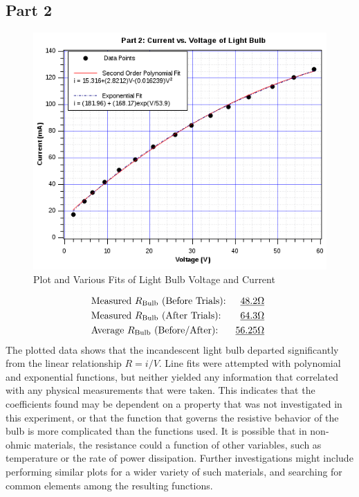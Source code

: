 \documentclass[twocolumn,english]{IEEEtran}
\theoremstyle{plain}
\theoremstyle{plain}
\begin{document}
\subsection*{Part 2}
  \begin{figure}[H]
  \begin{centering}
  \begin{center}
  \includegraphics[width=\linewidth]{./part2graph.png}
  \caption{Plot and Various Fits of Light Bulb Voltage and Current}
  \label{fig:graph_part2}
  \end{center}
  \par\end{centering}
  \end{figure}
  \begin{align*}
  &\text{Measured $R_{\text{Bulb}}$ (Before Trials):} 		&\text{\underline{48.2$\Omega$} } 	\\
  &\text{Measured $R_{\text{Bulb}}$ (After Trials):} 		&\text{\underline{64.3$\Omega$} }	\\
  &\text{Average $R_{\text{Bulb}}$ (Before/After):}		&\text{\underline{56.25$\Omega$} }	\\
  \end{align*}
  The plotted data shows that the incandescent light bulb departed significantly from the linear relationship $R=i/V$. Line fits were attempted with polynomial and exponential functions, but neither yielded any information that correlated with any physical measurements that were taken. This indicates that the coefficients found may be dependent on a property that was not investigated in this experiment, or that the function that governs the resistive behavior of the bulb is more complicated than the functions used. It is possible that in non-ohmic materials, the resistance could a function of other variables, such as temperature or the rate of power dissipation. Further investigations might include performing similar plots for a wider variety of such materials, and searching for common elements among the resulting functions.
\end{document}
